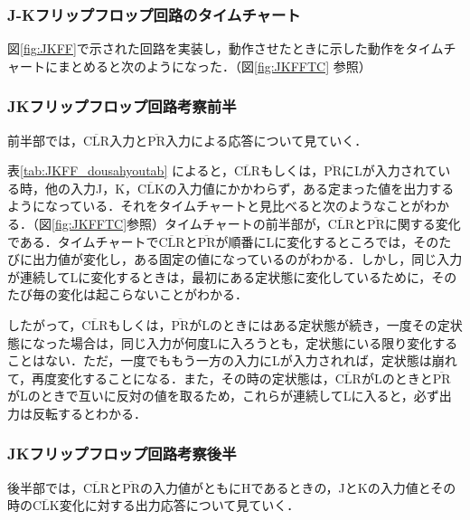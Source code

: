 %
%
\subsubsection{J-Kフリップフロップ回路のタイムチャート}
\label{JKFF_explain}
図\ref{fig:JKFF}で示された回路を実装し，動作させたときに示した動作をタイムチャートにまとめると次のようになった．（図\ref{fig:JKFFTC} 参照）

%
%
\subsubsection{JKフリップフロップ回路考察前半}
\label{JKFF_consideration3}
前半部では，$\overline{\mathrm{CLR}}$入力と$\overline{\mathrm{PR}}$入力による応答について見ていく．

表\ref{tab:JKFF_dousahyoutab} によると，$\overline{\mathrm{CLR}}$もしくは，$\overline{\mathrm{PR}}$にLが入力されている時，他の入力J，K，$\overline{\mathrm{CLK}}$の入力値にかかわらず，ある定まった値を出力するようになっている．それをタイムチャートと見比べると次のようなことがわかる．（図\ref{fig:JKFFTC}参照）タイムチャートの前半部が，$\overline{\mathrm{CLR}}$と$\overline{\mathrm{PR}}$に関する変化である．タイムチャートで$\overline{\mathrm{CLR}}$と$\overline{\mathrm{PR}}$が順番にLに変化するところでは，そのたびに出力値が変化し，ある固定の値になっているのがわかる．しかし，同じ入力が連続してLに変化するときは，最初にある定状態に変化しているために，そのたび毎の変化は起こらないことがわかる．

したがって，$\overline{\mathrm{CLR}}$もしくは，$\overline{\mathrm{PR}}$がLのときにはある定状態が続き，一度その定状態になった場合は，同じ入力が何度Lに入ろうとも，定状態にいる限り変化することはない．ただ，一度でももう一方の入力にLが入力されれば，定状態は崩れて，再度変化することになる．また，その時の定状態は，$\overline{\mathrm{CLR}}$がLのときと$\overline{\mathrm{PR}}$がLのときで互いに反対の値を取るため，これらが連続してLに入ると，必ず出力は反転するとわかる．

%
%
\subsubsection{JKフリップフロップ回路考察後半}
\label{JKFF_consideration3}
後半部では，$\overline{\mathrm{CLR}}$と$\overline{\mathrm{PR}}$の入力値がともにHであるときの，JとKの入力値とその時の$\overline{\mathrm{CLK}}$変化に対する出力応答について見ていく．

